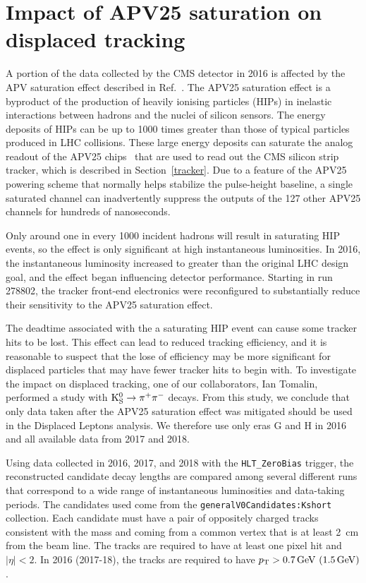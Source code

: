\chapter{Impact of APV25 saturation on displaced tracking}
\label{k0}
A portion of the data collected by the CMS detector in 2016 is affected by the APV saturation effect described in Ref.~\cite{hip_study}. The APV25 saturation effect is a byproduct of the production of heavily ionising particles (HIPs) in inelastic interactions between hadrons and the nuclei of silicon sensors. The energy deposits of HIPs can be up to 1000 times greater than those of typical particles produced in LHC collisions. These large energy deposits can saturate the analog readout of the APV25 chips~\cite{apv25} that are used to read out the CMS silicon strip tracker, which is described in Section~\ref{tracker}. Due to a feature of the APV25 powering scheme that normally helps stabilize the pulse-height baseline, a single saturated channel can inadvertently suppress the outputs of the 127 other APV25 channels for hundreds of nanoseconds.

Only around one in every 1000 incident hadrons will result in saturating HIP events, so the effect is only significant at high instantaneous luminosities. In 2016, the instantaneous luminosity increased to greater than the original LHC design goal, and the effect began influencing detector performance. Starting in run 278802, the tracker front-end electronics were reconfigured to substantially reduce their sensitivity to the APV25 saturation effect.

The deadtime associated with the a saturating HIP event can cause some tracker hits to be lost. This effect can lead to reduced tracking efficiency, and it is reasonable to suspect that the lose of efficiency may be more significant for displaced particles that may have fewer tracker hits to begin with. To investigate the impact on displaced tracking, one of our collaborators, Ian Tomalin, performed a study with $\mathrm{K^0_S}\to\pi^+\pi^-$ decays. From this study, we conclude that only data taken after the APV25 saturation effect was mitigated should be used in the Displaced Leptons analysis. We therefore use only eras G and H in 2016 and all available data from 2017 and 2018.

Using data collected in 2016, 2017, and 2018 with the \texttt{HLT\_ZeroBias} trigger, the reconstructed \Kzero candidate decay lengths are compared among several different runs that correspond to a wide range of instantaneous luminosities and data-taking periods. The \Kzero candidates used come from the \texttt{generalV0Candidates:Kshort} collection. Each candidate must have a pair of oppositely charged tracks consistent with the \Kzero mass and coming from a common vertex that is at least \SI{2}{\cm} from the beam line. The tracks are required to have at least one pixel hit and $|\eta|<2$. In 2016 (2017-18), the tracks are required to have $\pt>\SI{0.7}{\GeV}\ (\SI{1.5}{\GeV})$.

